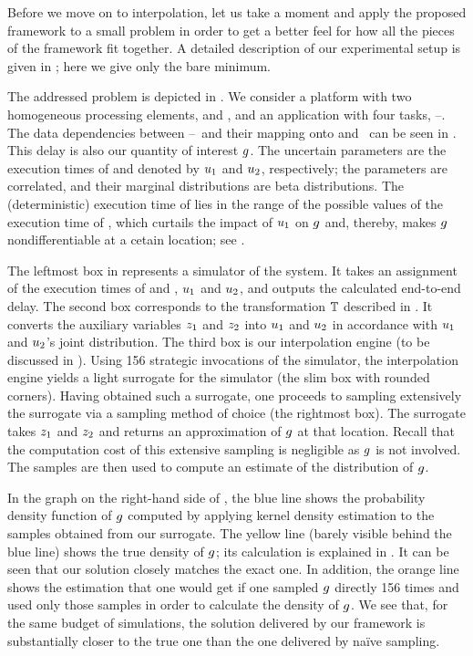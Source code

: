 Before we move on to interpolation, let us take a moment and apply the proposed
framework to a small problem in order to get a better feel for how all the
pieces of the framework fit together. A detailed description of our experimental
setup is given in ; here we give only the bare minimum.

\newcommand{\cores}{\token{PE1} and \token{PE2}}
\newcommand{\tasks}{\token{T1}--\token{T4}}
The addressed problem is depicted in . We consider a platform with
two homogeneous processing elements, \cores, and an application with four tasks,
\tasks. The data dependencies between \tasks\ and their mapping onto \cores\ can
be seen in . This delay is also our quantity of interest $g$. The
uncertain parameters are the execution times of  and 
denoted by $u_1$ and $u_2$, respectively; the parameters are correlated, and
their marginal distributions are beta distributions. The (deterministic)
execution time of  lies in the range of the possible values of the
execution time of , which curtails the impact of $u_1$ on $g$ and,
thereby, makes $g$ nondifferentiable at a cetain location; see
.

The leftmost box in  represents a simulator of the system. It
takes an assignment of the execution times of  and , $u_1$
and $u_2$, and outputs the calculated end-to-end delay. The second box
corresponds to the transformation $\mathbb{T}$ described in
. It converts the auxiliary variables $z_1$ and $z_2$ into
$u_1$ and $u_2$ in accordance with $u_1$ and $u_2$'s joint distribution. The
third box is our interpolation engine (to be discussed in ).
Using 156 strategic invocations of the simulator, the interpolation engine
yields a light surrogate for the simulator (the slim box with rounded corners).
Having obtained such a surrogate, one proceeds to sampling extensively the
surrogate via a sampling method of choice (the rightmost box). The surrogate
takes $z_1$ and $z_2$ and returns an approximation of $g$ at that location.
Recall that the computation cost of this extensive sampling is negligible as
$g$ is not involved. The samples are then used to compute an estimate of the
distribution of $g$.

In the graph on the right-hand side of , the blue line shows the
probability density function of $g$ computed by applying kernel density
estimation to the samples obtained from our surrogate. The yellow line (barely
visible behind the blue line) shows the true density of $g$; its calculation is
explained in . It can be seen that our solution closely
matches the exact one. In addition, the orange line shows the estimation that
one would get if one sampled $g$ directly 156 times and used only those samples
in order to calculate the density of $g$. We see that, for the same budget of
simulations, the solution delivered by our framework is substantially closer to
the true one than the one delivered by na\"{i}ve sampling.

